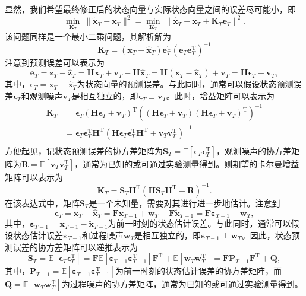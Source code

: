 显然，我们希望最终修正后的状态向量与实际状态向量之间的误差尽可能小，即
\[
    \min_{\mathbf{K}_T} \ \big\|\tilde{\bm{x}}_T - \bm{x}_T \big\|^2 = \min_{\mathbf{K}_T} \ \big\| \hat{\bm{x}}_T - \bm{x}_T + \mathbf{K}_T \bm{e}_T \big\|^2.
\]
该问题同样是一个最小二乘问题，其解析解为
\[
    \mathbf{K}_T = \left( \bm{x}_T - \hat{\bm{x}}_T \right) \bm{e}_T^{\mathrm{T}} \left( \bm{e}_T \bm{e}_T^{\mathrm{T}} \right)^{-1}
\]
注意到预测误差可以表示为
\[
    \bm{e}_T = \bm{z}_T - \hat{\bm{z}}_T = \mathbf{H} \bm{x}_T + \bm{v}_T - \mathbf{H} \hat{\bm{x}}_T = \mathbf{H} (\bm{x}_T - \hat{\bm{x}}_T) + \bm{v}_T = \mathbf{H} \bm{\epsilon}_T + \bm{v}_T,
\]
其中，\( \bm{\epsilon}_T = \bm{x}_T - \hat{\bm{x}}_T \)为状态向量的预测误差。与此同时，通常可以假设状态预测误差\( \bm{\epsilon}_T \)和观测噪声\( \bm{v}_T \)是相互独立的，即\( \bm{\epsilon}_T \perp \bm{v}_T \)。此时，增益矩阵可以表示为
\[
    \begin{split}
        \mathbf{K}_T & = \bm{\epsilon}_T (\mathbf{H} \bm{\epsilon}_T + \bm{v}_T)^{\mathrm{T}} \left( (\mathbf{H} \bm{\epsilon}_T + \bm{v}_T) (\mathbf{H} \bm{\epsilon}_T + \bm{v}_T)^{\mathrm{T}} \right)^{-1}                     \\
                     & = \bm{\epsilon}_T \bm{\epsilon}_T^{\mathrm{T}} \mathbf{H}^{\mathrm{T}} \left( \mathbf{H} \bm{\epsilon}_T \bm{\epsilon}_T^{\mathrm{T}} \mathbf{H}^{\mathrm{T}} + \bm{v}_T \bm{v}_T^{\mathrm{T}} \right)^{-1} \\
    \end{split}
\]
方便起见，记状态预测误差的协方差矩阵为\( \mathbf{S}_T = \mathbb{E}[\bm{\epsilon}_T \bm{\epsilon}_T^{\mathrm{T}}] \)，观测噪声的协方差矩阵为\( \mathbf{R} = \mathbb{E}[\bm{v}_T \bm{v}_T^{\mathrm{T}}] \)，通常为已知的或可通过实验测量得到。则期望的卡尔曼增益矩阵可以表示为
\[
    \mathbf{K}_T = \mathbf{S}_T \mathbf{H}^{\mathrm{T}} \left( \mathbf{H} \mathbf{S}_T \mathbf{H}^{\mathrm{T}} + \mathbf{R} \right)^{-1}.
\]
在该表达式中，矩阵\( \mathbf{S}_T \)是一个未知量，需要对其进行进一步地估计。注意到
\[
    \bm{\epsilon}_T = \bm{x}_T - \hat{\bm{x}}_T = \mathbf{F} \bm{x}_{T-1} + \bm{w}_T - \mathbf{F} \tilde{\bm{x}}_{T-1} = \mathbf{F} \bm{\varepsilon }_{T-1} + \bm{w}_T,
\]
其中，\( \bm{\varepsilon}_{T-1} = \bm{x}_{T-1} - \tilde{\bm{x}}_{T-1} \)为前一时刻的状态估计误差。与此同时，通常可以假设状态估计误差\( \bm{\varepsilon}_{T-1} \)和过程噪声\( \bm{w}_T \)是相互独立的，即\( \bm{\varepsilon}_{T-1} \perp \bm{w}_T \)。因此，状态预测误差的协方差矩阵可以递推表示为
\[
    \mathbf{S}_T = \mathbb{E}[\bm{\epsilon}_T \bm{\epsilon}_T^{\mathrm{T}}] = \mathbf{F} \mathbb{E}[\bm{\varepsilon}_{T-1} \bm{\varepsilon}_{T-1}^{\mathrm{T}}] \mathbf{F}^{\mathrm{T}} + \mathbb{E}[\bm{w}_T \bm{w}_T^{\mathrm{T}}] = \mathbf{F} \mathbf{P}_{T-1} \mathbf{F}^{\mathrm{T}} + \mathbf{Q},
\]
其中，\( \mathbf{P}_{T-1} = \mathbb{E}[\bm{\varepsilon}_{T-1} \bm{\varepsilon}_{T-1}^{\mathrm{T}}] \)为前一时刻的状态估计误差的协方差矩阵，而\( \mathbf{Q} = \mathbb{E}[\bm{w}_T \bm{w}_T^{\mathrm{T}}] \)为过程噪声的协方差矩阵，通常为已知的或可通过实验测量得到。

